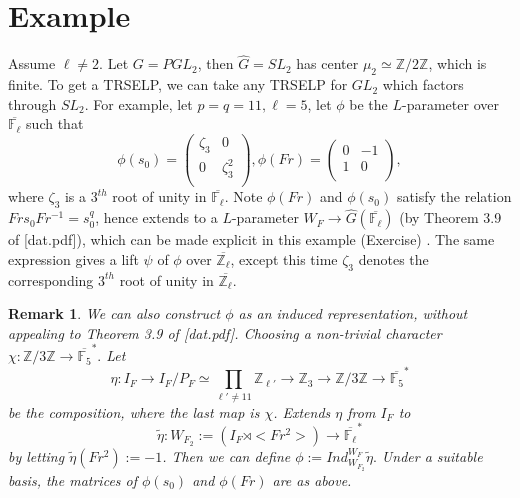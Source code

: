 \documentclass{article}
\newcommand{\blue}[1]{\textcolor{blue}{#1}}
\newtheorem*{remark}{Remark}
\begin{document}
	
	\section{Example}
	
	Assume $\ell \neq 2$. Let $G=PGL_2$, then $\hat{G}=SL_2$ has center $\mu_2 \simeq \mathbb{Z}/2\mathbb{Z}$, which is finite. To get a TRSELP, we can take any TRSELP for $GL_2$ which factors through $SL_2$. For example, let $p=q=11, \ell=5$, let $\phi$ be the $L$-parameter over $\overline{\mathbb{F}_{\ell}}$ such that $$\phi(s_0)=\begin{pmatrix} 
		\zeta_3 & 0 \\
		0 & \zeta_3^2 \\
	\end{pmatrix}, \phi(Fr)=\begin{pmatrix} 
		0 & -1 \\
		1 & 0 \\
	\end{pmatrix},$$
	where $\zeta_3$ is a $3^{th}$ root of unity in $\overline{\mathbb{F}_{\ell}}$. Note $\phi(Fr)$ and $\phi(s_0)$ satisfy the relation $Frs_0Fr^{-1}=s_0^q$, hence extends to a $L$-parameter $W_F \to \hat{G}(\overline{\mathbb{F}_{\ell}})$ (by Theorem 3.9 of [dat.pdf]), %
		which can be made explicit in this example (Exercise)%
	. The same expression gives a lift $\psi$ of $\phi$ over $\overline{\mathbb{Z}_{\ell}}$, except this time $\zeta_3$ denotes the corresponding $3^{th}$ root of unity in $\overline{\mathbb{Z}_{\ell}}$.
	
	\begin{remark}
		We can also construct $\phi$ as an induced representation, without appealing to Theorem 3.9 of [dat.pdf]. Choosing a non-trivial character $\chi: \mathbb{Z}/3\mathbb{Z} \to \overline{\mathbb{F}_5}^*.$ Let $$\eta: I_F \to I_F/P_F \simeq \prod_{\ell' \neq 11}\mathbb{Z}_{\ell'} \to \mathbb{Z}_3 \to \mathbb{Z}/3\mathbb{Z} \to \overline{\mathbb{F}_5}^*$$ be the composition, where the last map is $\chi$. Extends $\eta$ from $I_F$ to 
		$$\tilde{\eta}: W_{F_2}:= (I_F \rtimes <Fr^2>) \to \overline{\mathbb{F}_{\ell}}^*$$ 
		by letting $\tilde{\eta}(Fr^2):=-1$. Then we can define $\phi:=Ind_{W_{F_2}}^{W_F}\tilde{\eta}.$ Under a suitable basis, the matrices of $\phi(s_0)$ and $\phi(Fr)$ are as above.
	\end{remark}
	
\end{document}
